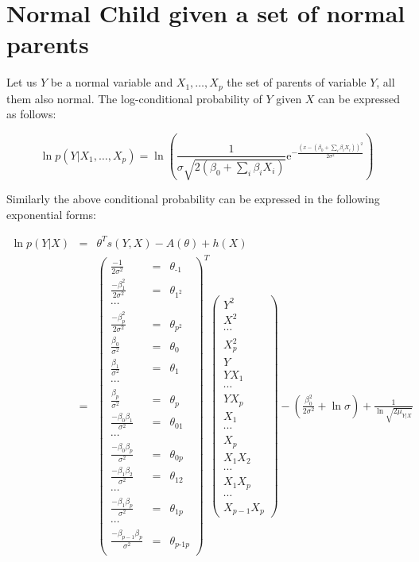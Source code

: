 \documentclass[11pt, oneside]{article}   	%
\newcommand{\me}{\mathrm{e}}
\numberwithin{figure}{section}
\numberwithin{equation}{section}
\numberwithin{table}{section}
\begin{document}
\section{Normal Child given a set of normal parents}

Let us $Y$ be a normal variable and $X_1,\ldots,X_p$ the set of parents of variable $Y$, all them also normal. The log-conditional probability of $Y$ given $X$ can be expressed as follows:

$$ \ln p(Y|X_1,\ldots,X_p) = \ln \left(\frac{1}{\sigma \sqrt{2(\beta_0+\sum_i \beta_i X_i )}} \me^{-\frac{(x-(\beta_0+\sum_i \beta_i X_i))^2}{2\sigma^2}} \right)$$


Similarly the above conditional probability can be expressed in the following exponential forms:

\begin{eqnarray*}
\ln p(Y|X) &=& \theta^T s(Y,X) - A(\theta) + h(X)\\
&=&
\begin{pmatrix}
\frac{-1}{2\sigma^2} &=& \theta_{\mbox{-}1} \\
\frac{-\beta_1^2}{2\sigma^2} &=& \theta_{1^2} \\
\cdots \\
\frac{-\beta_p^2}{2\sigma^2} &=& \theta_{p^2} \\
\frac{\beta_0}{\sigma^2} &=& \theta_0 \\
\frac{\beta_1}{\sigma^2} &=& \theta_1 \\
\cdots\\
\frac{\beta_p}{\sigma^2} &=& \theta_p \\
\frac{-\beta_0\beta_1}{\sigma^2} &=&\theta_{01} \\
\cdots\\
\frac{-\beta_0\beta_p}{\sigma^2} &=& \theta_{0p} \\
\frac{-\beta_1\beta_2}{\sigma^2} &=& \theta_{12} \\
\cdots\\
\frac{-\beta_1\beta_p}{\sigma^2} &=& \theta_{1p} \\
\cdots\\
\frac{-\beta_{p-1}\beta_p}{\sigma^2} &=&\theta_{p\mbox{-}1p} \\
\end{pmatrix}^T
\begin{pmatrix}
Y^2\\
X^2\\
\cdots\\
X_p^2\\
Y\\
YX_1\\
\cdots\\
YX_p\\
X_1\\
\cdots\\
X_p\\
X_1X_2\\
\cdots\\
X_1X_p\\
\cdots\\
X_{p-1}X_p
\end{pmatrix}
- \left( \frac{\beta_0^2}{2\sigma^2} + \ln{\sigma}\right) + \frac{1}{\ln{\sqrt{2\mu_{Y|X}}}}
\end{eqnarray*}
\end{document}

